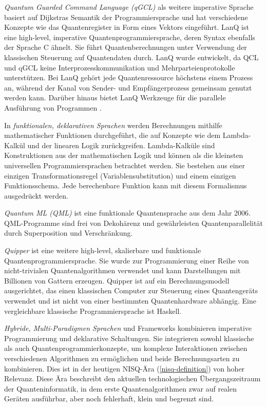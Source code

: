 \textit{Quantum Guarded Command Language (qGCL)} als weitere imperative Sprache basiert auf Dijkstras Semantik der Programmiersprache und hat verschiedene Konzepte wie das Quantenregister in Form eines Vektors eingeführt. LanQ ist eine high-level, imperative Quantenprogrammiersprache, deren Syntax ebenfalls der Sprache C ähnelt. Sie führt Quantenberechnungen unter Verwendung der klassischen Steuerung auf Quantendaten durch. LanQ wurde entwickelt, da QCL und qGCL keine Interprozesskommunikation und Mehrparteienprotokolle unterstützen. Bei LanQ gehört jede Quantenressource höchstens einem Prozess an, während der Kanal von Sender- und Empfängerprozess gemeinsam genutzt werden kann. Darüber hinaus bietet LanQ Werkzeuge für die parallele Ausführung von Programmen \autocite{garhwal_quantum_2021}.

In \textit{funktionalen, deklarativen Sprachen} werden Berechnungen mithilfe mathematischer Funktionen durchgeführt, die auf Konzepte wie dem Lambda-Kalkül und der linearen Logik zurückgreifen. Lambda-Kalküle sind Konstruktionen aus der mathematischen Logik und können als die kleinsten universellen Programmiersprachen betrachtet werden. Sie bestehen aus einer einzigen Transformationsregel (Variablensubstitution) und einem einzigen Funktionsschema. Jede berechenbare Funktion kann mit diesem Formalismus ausgedrückt werden. \autocite{garhwal_quantum_2021}

\textit{Quantum ML (QML)} ist eine funktionale Quantensprache aus dem Jahr 2006. QML-Programme sind frei von Dekohärenz und gewährleisten Quantenparallelität durch Superposition und Verschränkung. \autocite{garhwal_quantum_2021}

\textit{Quipper} ist eine weitere high-level, skalierbare und funktionale Quantenprogrammiersprache. Sie wurde zur Programmierung einer Reihe von nicht-trivialen Quantenalgorithmen verwendet und kann Darstellungen mit Billionen von Gattern erzeugen. Quipper ist auf ein Berechnungsmodell ausgerichtet, das einen klassischen Computer zur Steuerung eines Quantengeräts verwendet und ist nicht von einer bestimmten Quantenhardware abhängig. \autocite{green_quipper_2013} Eine vergleichbare klassische Programmiersprache ist Haskell.

\textit{Hybride, Multi-Paradigmen Sprachen} und Frameworks kombinieren imperative Programmierung und deklarative Schaltungen. Sie integrieren sowohl klassische als auch Quantenprogrammierkonzepte, um komplexe Interaktionen zwischen verschiedenen Algorithmen zu ermöglichen und beide Berechnungsarten zu kombinieren. Dies ist in der heutigen NISQ-Ära (\autoref{nisq-definition}) von hoher Relevanz. Diese Ära beschreibt den aktuellen technologischen Übergangszeitraum der Quanteninformatik, in dem erste Quantenalgorithmen zwar auf realen Geräten ausführbar, aber noch fehlerhaft, klein und begrenzt sind. 

